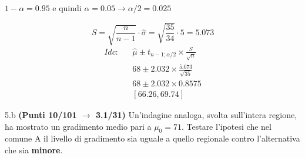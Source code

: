 \documentclass[
  11pt,
]{book}
\theoremstyle{mytheoremstyle}
\theoremstyle{mydefstyle}
\newenvironment{sol}
  {
  \begin{tcolorbox}[enhanced,breakable,arc=0.1mm,boxrule=1pt,colback=white,colframe=iblue,
  title=\bf \fontfamily{lmss}\selectfont \hspace{.5 cm} Soluzione,drop fuzzy shadow]

}{
\end{tcolorbox}
  }
\begin{document}
\begin{sol}
\(1-\alpha =0.95\) e quindi \(\alpha=0.05\rightarrow \alpha/2=0.025\)

\[
      S  =\sqrt{\frac {n}{n-1}}\cdot\hat\sigma =
     \sqrt{\frac { 35 }{ 34 }}\cdot 5 = 5.073 
\]
\begin{eqnarray*}
  Idc: & &  \hat\mu \pm  t_{n-1;\alpha/2} \times \frac{S}{\sqrt{n}} \\
     & &  68 \pm  2.032 \times \frac{ 5.073 }{\sqrt{ 35 }} \\
     & &  68 \pm  2.032 \times  0.8575 \\
     & & [ 66.26 ,  69.74 ]
\end{eqnarray*}

\end{sol}

5.b \textbf{(Punti 10/101 \(\rightarrow\) 3.1/31)} Un'indagine analoga, svolta sull'intera regione, ha mostrato un gradimento medio pari a \(\mu_0=71\). Testare l'ipotesi che nel comune A il livello di gradimento sia uguale a quello regionale contro l'alternativa che sia \textbf{minore}.
\end{document}
